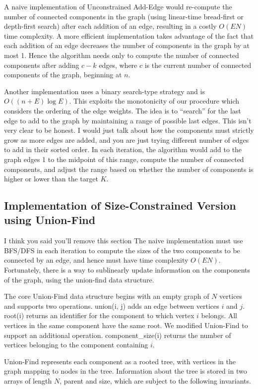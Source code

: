 A naive implementation of Unconstrained Add-Edge would re-compute the
number of connected components in the graph (using linear-time
bread-first or depth-first search) after each addition of an edge,
resulting in a costly $O(EN)$ time complexity. A more efficient
implementation takes advantage of the fact that each addition of an
edge decreases the number of components in the graph by at most 1.
Hence the algorithm needs only to compute the number of connected
components after adding $c - k$ edges, where $c$ is the current number
of connected components of the graph, beginning at $n$.

Another implementation uses a binary search-type strategy and is
$O((n + E) \log E)$. This exploits the monotonicity of our 
procedure which considers the ordering of the edge weights.
The idea is to ``search'' for the last edge to add
to the graph by maintaining a range of possible last edges.
{\color{red}This isn't very clear to be honest. I would just 
talk about how the components must strictly grow as more edges are 
added, and you are just trying different number of edges to add
in their sorted order.} In each
iteration, the algorithm would add to the graph edges 1 to the midpoint
of this range, compute the number of connected components, and adjust
the range based on whether the number of components is higher or lower
than the target $K$.

\subsection{Implementation of Size-Constrained Version using Union-Find}

{\color{red}I think you said you'll remove this section}
The naive implementation must use BFS/DFS in each iteration to compute
the sizes of the two components to be connected by an edge, and hence
must have time complexity $O(EN)$. Fortunately, there is a way to
sublinearly update information on the components of the graph, using
the union-find data structure.

The core Union-Find data structure begins with an empty graph of $N$
vertices and supports two operations. union(i, j) adds an edge between
vertices $i$ and $j$. root(i) returns an identifier for the component
to which vertex $i$ belongs. All vertices in the same component have the
same root. We modified Union-Find to support an additional operation.
component\_size(i) returns the number of vertices belonging to the
component containing $i$.

Union-Find represents each component as a rooted tree, with vertices in
the graph mapping to nodes in the tree. Information about the tree is
stored in two arrays of length $N$, parent and size, which are subject
to the following invariants.

